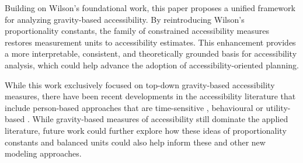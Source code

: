 \documentclass[
  10pt,
  letterpaper,
]{article}
\begin{document}
Building on Wilson's \citep{wilson1971} foundational work, this paper
proposes a unified framework for analyzing gravity-based accessibility.
By reintroducing Wilson's proportionality constants, the family of
constrained accessibility measures restores measurement units to
accessibility estimates. This enhancement provides a more interpretable,
consistent, and theoretically grounded basis for accessibility analysis,
which could help advance the adoption of accessibility-oriented
planning.

While this work exclusively focused on top-down gravity-based
accessibility measures, there have been recent developments in the
accessibility literature that include person-based approaches that are
time-sensitive \citep{yang2024evaluating, braga2023evaluating},
behavioural \citep{kar2024inclusive, lu2014effects} or utility-based
\citep{guzman2023much, ben1985discrete}. While gravity-based measures of
accessibility still dominate the applied literature, future work could
further explore how these ideas of proportionality constants and
balanced units could also help inform these and other new modeling
approaches.


\nolinenumbers
  
\end{document}
